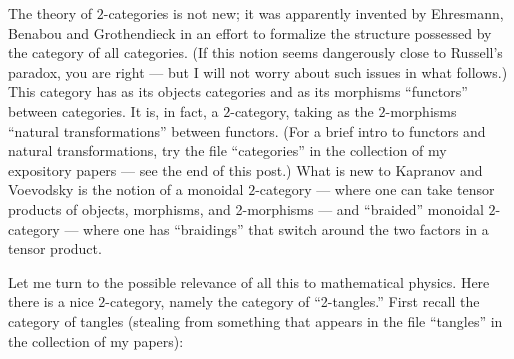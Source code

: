 \documentclass[12pt]{article}
\begin{document}
The theory of \(2\)-categories is not new; it was apparently invented by
Ehresmann, Benabou and Grothendieck in an effort to formalize the
structure possessed by the category of all categories. (If this notion
seems dangerously close to Russell's paradox, you are right --- but I
will not worry about such issues in what follows.) This category has as
its objects categories and as its morphisms ``functors'' between
categories. It is, in fact, a \(2\)-category, taking as the
\(2\)-morphisms ``natural transformations'' between functors. (For a
brief intro to functors and natural transformations, try the file
``categories'' in the collection of my expository papers --- see the end
of this post.) What is new to Kapranov and Voevodsky is the notion of a
monoidal \(2\)-category --- where one can take tensor products of
objects, morphisms, and 2-morphisms --- and ``braided'' monoidal
\(2\)-category --- where one has ``braidings'' that switch around the
two factors in a tensor product.

Let me turn to the possible relevance of all this to mathematical
physics. Here there is a nice \(2\)-category, namely the category of
``2-tangles.'' First recall the category of tangles (stealing from
something that appears in the file ``tangles'' in the collection of my
papers):
\end{document}
